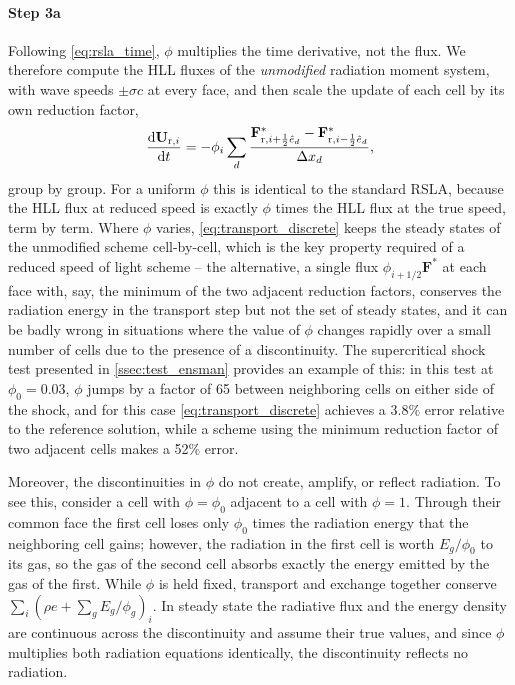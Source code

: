 \documentclass[preprint,12pt,authoryear]{elsarticle}
\newcommand{\vecU}{\mathbf{U}}
\newcommand{\vecF}{\mathbf{F}}
\begin{document}
\paragraph{Step 3a} Following \autoref{eq:rsla_time}, $\phi$ multiplies the time derivative, not the flux. We therefore compute the HLL fluxes of the \emph{unmodified} radiation moment system, with wave speeds $\pm\sigma c$ at every face, and then scale the update of each cell by its own reduction factor,
\begin{equation}
    \frac{\mathrm{d}\vecU_{{\rm r},i}}{\mathrm{d}t} = -\phi_i\sum_d \frac{\vecF^*_{{\rm r},i+\frac{1}{2}\hat{e}_d} - \vecF^*_{{\rm r},i-\frac{1}{2}\hat{e}_d}}{\Delta x_d},
    \label{eq:transport_discrete}
\end{equation}
group by group. For a uniform $\phi$ this is identical to the standard RSLA, because the HLL flux at reduced speed is exactly $\phi$ times the HLL flux at the true speed, term by term. Where $\phi$ varies, \autoref{eq:transport_discrete} keeps the steady states of the unmodified scheme cell-by-cell, which is the key property required of a reduced speed of light scheme -- the alternative, a single flux $\phi_{i+1/2}\vecF^*$ at each face with, say, the minimum of the two adjacent reduction factors, conserves the radiation energy in the transport step but not the set of steady states, and it can be badly wrong in situations where the value of $\phi$ changes rapidly over a small number of cells due to the presence of a discontinuity. The supercritical shock test presented in \autoref{ssec:test_ensman} provides an example of this: in this test at $\phi_0 = 0.03$, $\phi$ jumps by a factor of 65 between neighboring cells on either side of the shock, and for this case \autoref{eq:transport_discrete} achieves a $3.8\%$ error relative to the reference solution, while a scheme using the minimum reduction factor of two adjacent cells makes a 52\% error.

Moreover, the discontinuities in $\phi$ do not create, amplify, or reflect radiation. To see this, consider a cell with $\phi=\phi_0$ adjacent to a cell with $\phi=1$. Through their common face the first cell loses only $\phi_0$ times the radiation energy that the neighboring cell gains; however, the radiation in the first cell is worth $E_g/\phi_0$ to its gas, so the gas of the second cell absorbs exactly the energy emitted by the gas of the first. While $\phi$ is held fixed, transport and exchange together conserve $\sum_i (\rho e + \sum_g E_g/\phi_g)_i$. In steady state the radiative flux and the energy density are continuous across the discontinuity and assume their true values, and since $\phi$ multiplies both radiation equations identically, the discontinuity reflects no radiation.
\end{document}
